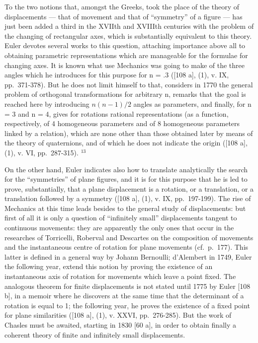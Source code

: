 To the two notions that, amongst the Greeks, took the place of the theory of displacements --- that of movement and that of ``symmetry'' of a figure --- has just been added a third in the XVIIth and XVIIIth centuries with the problem of the changing of rectangular axes, which is substantially equivalent to this theory. Euler devotes several works to this question, attaching importance above all to obtaining parametric representations which are manageable for the formulae for changing axes. It is known what use Mechanics was going to make of the three angles which he introduces for this purpose for n = .3 ({[}108 a{]}, (1), v. IX, pp.~371-378). But he does not limit himself to that, considers in 1770 the general problem of orthogonal transformations for arbitrary n, remarks that the goal is reached here by introducing \(n(n - 1)/2\) angles as parameters, and finally, for n = 3 and n = 4, gives for rotations rational representations (as a function, respectively, of 4 homogeneous parameters and of 8 homogeneous parameters linked by a relation), which are none other than those obtained later by means of the theory of quaternions, and of which he does not indicate the origin ({[}108 a{]}, (1), v. VI, pp.~287-315). \(^{13}\)

On the other hand, Euler indicates also how to translate analytically the search for the ``symmetries'' of plane figures, and it is for this purpose that he is led to prove, substantially, that a plane displacement is a rotation, or a translation, or a translation followed by a symmetry ({[}108 a{]}, (1), v. IX, pp.~197-199). The rise of Mechanics at this time leads besides to the general study of displacements: but first of all it is only a question of ``infinitely small'' displacements tangent to continuous movements: they are apparently the only ones that occur in the researches of Torricelli, Roberval and Descartes on the composition of movements and the instantaneous centre of rotation for plane movements (cf.~p.~177). This latter is defined in a general way by Johann Bernoulli; d'Alembert in 1749, Euler the following year, extend this notion by proving the existence of an instantaneous axis of rotation for movements which leave a point fixed. The analogous theorem for finite displacements is not stated until 1775 by Euler {[}108 b{]}, in a memoir where he discovers at the same time that the determinant of a rotation is equal to 1; the following year, he proves the existence of a fixed point for plane similarities ({[}108 a{]}, (1), v. XXVI, pp.~276-285). But the work of Chasles must be awaited, starting in 1830 {[}60 a{]}, in order to obtain finally a coherent theory of finite and infinitely small displacements.

